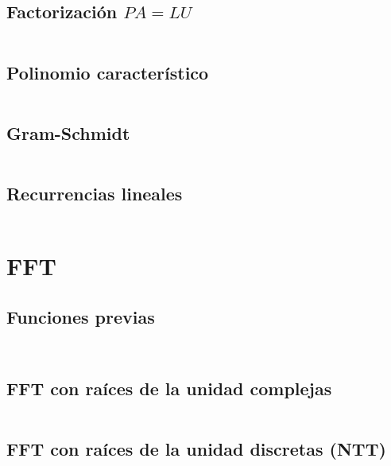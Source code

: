 \documentclass[11pt]{article}
\begin{document}
		\subsection{Factorización $PA=LU$}
		\inputminted[tabsize=2,breaklines,firstline=378,lastline=394,fontsize=\small]{c++}{matrix.cpp}
		
		\subsection{Polinomio característico}
		\inputminted[tabsize=2,breaklines,firstline=396,lastline=406,fontsize=\small]{c++}{matrix.cpp}
		
		\subsection{Gram-Schmidt}
		\inputminted[tabsize=2,breaklines,firstline=408,lastline=422,fontsize=\small]{c++}{matrix.cpp}
		
		\subsection{Recurrencias lineales}
		\inputminted[tabsize=2,breaklines,firstline=7,lastline=66,fontsize=\small]{c++}{recurrence.cpp}
		
	\newpage
	\section{FFT}
		\subsection{Funciones previas}
		\inputminted[tabsize=2,breaklines,firstline=3,lastline=15,fontsize=\small]{c++}{fft.cpp}
		\inputminted[tabsize=2,breaklines,firstline=32,lastline=47,fontsize=\small]{c++}{fft.cpp}
		
		\subsection{FFT con raíces de la unidad complejas}
		\inputminted[tabsize=2,breaklines,firstline=49,lastline=77,fontsize=\small]{c++}{fft.cpp}
		
		\subsection{FFT con raíces de la unidad discretas (NTT)}
		\inputminted[tabsize=2,breaklines,firstline=17,lastline=20,fontsize=\small]{c++}{fft.cpp}
		\inputminted[tabsize=2,breaklines,firstline=22,lastline=30,fontsize=\small]{c++}{fft.cpp}
		\inputminted[tabsize=2,breaklines,firstline=79,lastline=105,fontsize=\small]{c++}{fft.cpp}
\end{document}
